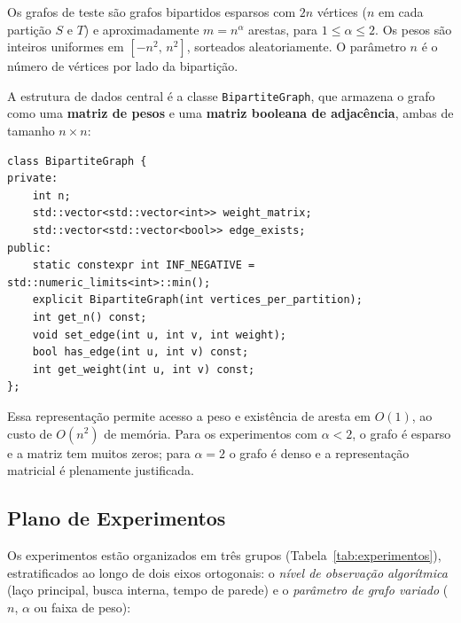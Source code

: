 \documentclass{infufrgs}
\begin{document}
Os grafos de teste são grafos bipartidos esparsos com $2n$ vértices ($n$ em cada partição $S$ e $T$) e aproximadamente $m = n^\alpha$ arestas, para $1 \le \alpha \le 2$. Os pesos são inteiros uniformes em $[-n^2,\, n^2]$, sorteados aleatoriamente. O parâmetro $n$ é o número de vértices por lado da bipartição.

A estrutura de dados central é a classe \texttt{BipartiteGraph}, que armazena o grafo como uma \textbf{matriz de pesos} e uma \textbf{matriz booleana de adjacência}, ambas de tamanho $n \times n$:

\begin{lstlisting}[caption={Estrutura de dados BipartiteGraph (BipartiteGraph.h)}]
class BipartiteGraph {
private:
    int n;
    std::vector<std::vector<int>> weight_matrix;
    std::vector<std::vector<bool>> edge_exists;
public:
    static constexpr int INF_NEGATIVE = std::numeric_limits<int>::min();
    explicit BipartiteGraph(int vertices_per_partition);
    int get_n() const;
    void set_edge(int u, int v, int weight);
    bool has_edge(int u, int v) const;
    int get_weight(int u, int v) const;
};
\end{lstlisting}

Essa representação permite acesso a peso e existência de aresta em $O(1)$, ao custo de $O(n^2)$ de memória. Para os experimentos com $\alpha < 2$, o grafo é esparso e a matriz tem muitos zeros; para $\alpha = 2$ o grafo é denso e a representação matricial é plenamente justificada.

\subsection{Plano de Experimentos}

Os experimentos estão organizados em três grupos (Tabela~\ref{tab:experimentos}), estratificados ao longo de dois eixos ortogonais: o \emph{nível de observação algorítmica} (laço principal, busca interna, tempo de parede) e o \emph{parâmetro de grafo variado} ($n$, $\alpha$ ou faixa de peso):
\end{document}
